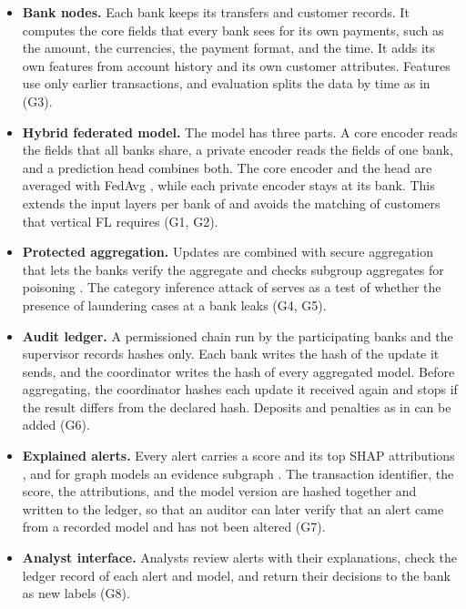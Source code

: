 \documentclass[journal]{IEEEtran}
\begin{document}
\begin{itemize}
\item \textbf{Bank nodes.} Each bank keeps its transfers and customer records. It computes the core fields that every bank sees for its own payments, such as the amount, the currencies, the payment format, and the time. It adds its own features from account history and its own customer attributes. Features use only earlier transactions, and evaluation splits the data by time as in \cite{mao2026pmegnn,nayak2026quantum} (G3).
\item \textbf{Hybrid federated model.} The model has three parts. A core encoder reads the fields that all banks share, a private encoder reads the fields of one bank, and a prediction head combines both. The core encoder and the head are averaged with FedAvg \cite{mcmahan2017fedavg}, while each private encoder stays at its bank. This extends the input layers per bank of \cite{tang2024sdt} and avoids the matching of customers that vertical FL requires \cite{li2026plc} (G1, G2).
\item \textbf{Protected aggregation.} Updates are combined with secure aggregation \cite{bonawitz2017secagg} that lets the banks verify the aggregate \cite{wang2023vosa} and checks subgroup aggregates for poisoning \cite{zhang2023safelearning}. The category inference attack of \cite{gao2023category} serves as a test of whether the presence of laundering cases at a bank leaks (G4, G5).
\item \textbf{Audit ledger.} A permissioned chain run by the participating banks and the supervisor records hashes only. Each bank writes the hash of the update it sends, and the coordinator writes the hash of every aggregated model. Before aggregating, the coordinator hashes each update it received again and stops if the result differs from the declared hash. Deposits and penalties as in \cite{yang2022accountable} can be added (G6).
\item \textbf{Explained alerts.} Every alert carries a score and its top SHAP attributions \cite{lundberg2017shap,awosika2024xai}, and for graph models an evidence subgraph \cite{nayak2026quantum}. The transaction identifier, the score, the attributions, and the model version are hashed together and written to the ledger, so that an auditor can later verify that an alert came from a recorded model and has not been altered (G7).
\item \textbf{Analyst interface.} Analysts review alerts with their explanations, check the ledger record of each alert and model, and return their decisions to the bank as new labels (G8).
\end{itemize}
\end{document}
